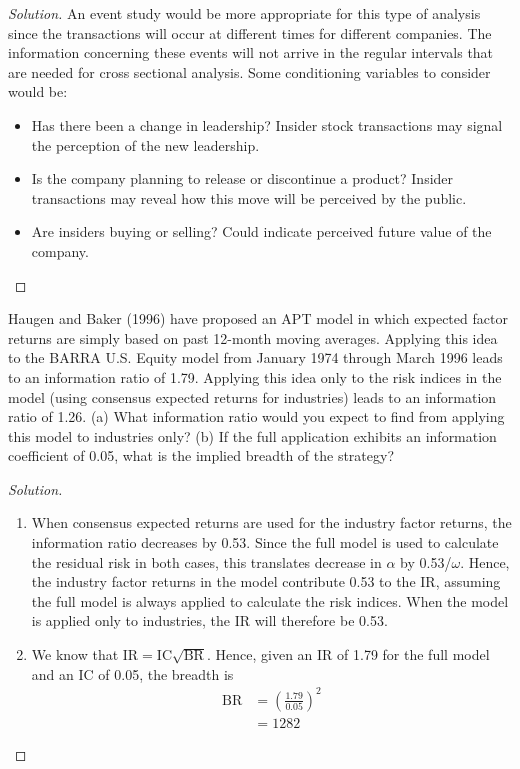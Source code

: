 \begin{proof}[Solution]
  An event study would be more appropriate for this type of analysis since the transactions will occur at different times for different companies. The information concerning these events will not arrive in the regular intervals that are needed for cross sectional analysis. Some conditioning variables to consider would be:
  \begin{itemize}
   \item{Has there been a change in leadership? Insider stock transactions may signal the perception of the new leadership.}
   \item{Is the company planning to release or discontinue a product? Insider transactions may reveal how this move will be perceived by the public.}
   \item{Are insiders buying or selling? Could indicate perceived future value of the company.}
  \end{itemize}

\end{proof}

\begin{problem}{12.7}
  Haugen and Baker (1996) have proposed an APT model in which expected factor returns are simply based on past 12-month moving averages. Applying this idea to the BARRA U.S. Equity model from January 1974 through March 1996 leads to an information ratio of 1.79. Applying this idea only to the risk indices in the model (using consensus expected returns for industries) leads to an information ratio of 1.26. (a) What information ratio would you expect to find from applying this model to industries only? (b) If the full application exhibits an information coefficient of 0.05, what is the implied breadth of the strategy?
\end{problem}

\begin{proof}[Solution]
  \quad\\
  \begin{enumerate}[label=(\alph*)]
    \item{When consensus expected returns are used for the industry factor returns, the information ratio decreases by 0.53. Since the full model is used to calculate the residual risk in both cases, this translates decrease in $\alpha$ by 0.53/$\omega$. Hence, the industry factor returns in the model contribute 0.53 to the IR, assuming the full model is always applied to calculate the risk indices. When the model is applied only to industries, the IR will therefore be 0.53.}
    \item{We know that $\mathrm{IR}=\mathrm{IC}\sqrt{\mathrm{BR}}$. Hence, given an IR of 1.79 for the full model and an IC of 0.05, the breadth is
    \begin{align*}
     \mathrm{BR}&=\left(\frac{1.79}{0.05}\right)^{2}\\
		&=1282
    \end{align*}}
  \end{enumerate}  
\end{proof}

